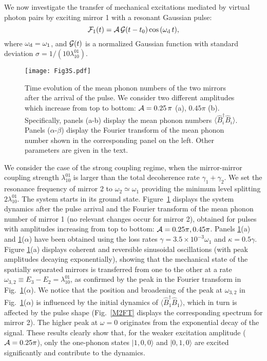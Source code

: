 \documentclass[aps,pra,twocolumn,floatfix,longbibliography, superscriptaddress]{revtex4-1}
\newcommand{\figref}[1]{\mbox{Fig.~\ref{#1}}}
\begin{document}
We now investigate the transfer of mechanical excitations  mediated by virtual photon pairs  %
by exciting mirror 1 with a resonant Gaussian pulse:
$${\cal F}_1(t) = {\cal A}\, {\cal G}(t-t_0) \cos{(\omega_{\rm d}\, t)},$$
where $\omega_{\rm d} = \omega_1$, and ${\cal G}(t)$ is a normalized Gaussian function with standard deviation $\sigma = 1 / (10 \lambda^{01}_{10})$. 
\begin{figure}
	\centering
	\texttt{[image: Fig3S.pdf]}
	\caption{Time evolution of the mean phonon numbers of the two mirrors  after the  arrival of the pulse. We consider two different amplitudes which increase from top to bottom: ${\cal A} = 0.25\,\pi$ (a), $0.45 \pi$ (b). Specifically, panels (a-b) display the mean phonon numbers $\langle \hat B_i^\dag \hat B_i^{} \rangle$. Panels ($\alpha$-$\beta$) display the Fourier transform of the mean phonon number shown in the corresponding panel on the left. Other parameters are given in the text.
		\label{fig:3S}}
\end{figure}
We consider the case of the strong coupling regime, when the mirror-mirror coupling strength $\lambda_{10}^{01}$ is larger than the total decoherence rate $\gamma_1 + \gamma_2$.
We set the resonance frequency of mirror 2 to $\omega_2 \simeq \omega_1$ providing the minimum level splitting $2 \lambda_{10}^{01}$. The system starts in its ground state. Figure~\ref{fig:3S} displays the system dynamics after the pulse arrival and the Fourier transform of the mean phonon number of mirror 1 (no relevant changes occur for mirror 2), obtained for pulses with amplitudes increasing from top to bottom: ${\cal A} = 0.25 \pi, 0.45 \pi$.
Panels \ref{fig:3S}(a) and \ref{fig:3S}($\alpha$) have been obtained using the loss rates $\gamma = 3.5 \times 10^{-3} \omega_1$ and $\kappa= 0.5 \gamma$.  Figure \ref{fig:3S}(a) displays coherent and reversible sinusoidal oscillations (with peak amplitudes decaying exponentially), showing that the mechanical state  of the spatially separated mirrors is transferred from one to the other at a rate $\omega_{3,2} \equiv E_3 - E_2 = \lambda_{10}^{01}$, as confirmed by the peak in the Fourier transform in Fig.~\ref{fig:3S}($\alpha$).
We notice that the position and broadening  of the peak at $\omega_{3,2}$ in Fig.~\ref{fig:3S}($\alpha$) is influenced by the initial dynamics of $\langle \hat B^\dag_1 \hat B_1 \rangle$, which in turn is affected by the pulse shape (\figref{M2FT} displays the corresponding spectrum for mirror 2).
The higher peak at $\omega = 0$ originates from the exponential decay of the signal.
These results clearly show that, for the weaker excitation amplitude (${\cal A} = 0.25 \pi$), only the one-phonon states $|1,0,0 \rangle$ and $|0,1,0\rangle$ are excited significantly and contribute to the dynamics. 
\end{document}
